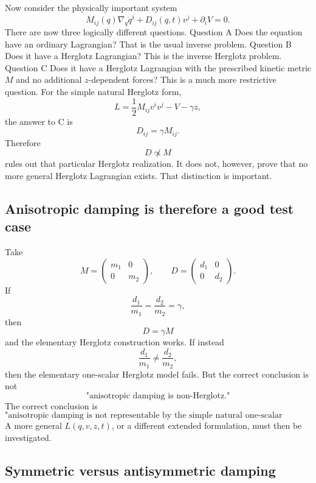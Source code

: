 Now consider the physically important system
\begin{equation}
 \boxed{ M_{ij}(q)\nabla_{\dot q}\dot q^j + D_{ij}(q,t)v^j + \partial_iV =0. } \tag{42} 
\end{equation}
There are now three logically different questions.
Question A
Does the equation have an ordinary Lagrangian?
That is the usual inverse problem.
Question B
Does it have a Herglotz Lagrangian?
This is the inverse Herglotz problem.
Question C
Does it have a Herglotz Lagrangian with the prescribed kinetic metric \(M\) and no additional \(z\)-dependent forces?
This is a much more restrictive question.
For the simple natural Herglotz form,
$$ L=\frac12M_{ij}v^iv^j-V-\gamma z, $$
the answer to C is
\begin{equation}
 \boxed{D_{ij}=\gamma M_{ij}.} \tag{43} 
\end{equation}
Therefore
$$ D\not\propto M $$
rules out that particular Herglotz realization.
It does not, however, prove that no more general Herglotz Lagrangian exists.
That distinction is important.

\subsection{Anisotropic damping is therefore a good test case}

Take
\begin{equation}
 M= \begin{pmatrix} m_1&0\\ 0&m_2 \end{pmatrix}, \qquad D= \begin{pmatrix} d_1&0\\ 0&d_2 \end{pmatrix}. \tag{44} 
\end{equation}
If
$$ \frac{d_1}{m_1} = \frac{d_2}{m_2} =\gamma, $$
then
$$ D=\gamma M $$
and the elementary Herglotz construction works.
If instead
$$ \frac{d_1}{m_1} \neq \frac{d_2}{m_2}, $$
then the elementary one-scalar Herglotz model fails.
But the correct conclusion is not
$$ \text{"anisotropic damping is non-Herglotz."} $$
The correct conclusion is
$$ \boxed{ \text{"anisotropic damping is not representable by the simple natural one-scalar Herglotz ansatz."} } $$
A more general \(L(q,v,z,t)\), or a different extended formulation, must then be investigated.

\subsection{Symmetric versus antisymmetric damping}

